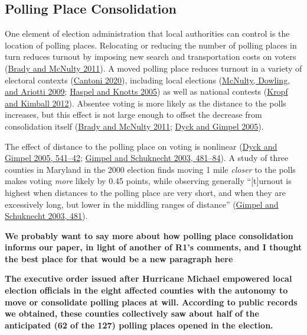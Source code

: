 \documentclass[
  12pt,
]{article}
\begin{document}
\hypertarget{polling-place-consolidation}{%
\subsection*{Polling Place Consolidation}\label{polling-place-consolidation}}

One element of election administration that local authorities can control is the location of polling places. Relocating or reducing the number of polling places in turn reduces turnout by imposing new search and transportation costs on voters (\protect\hyperlink{ref-Brady2011}{Brady and McNulty 2011}). A moved polling place reduces turnout in a variety of electoral contexts (\protect\hyperlink{ref-Cantoni2020}{Cantoni 2020}), including local elections (\protect\hyperlink{ref-McNulty2009}{McNulty, Dowling, and Ariotti 2009}; \protect\hyperlink{ref-Haspel2005}{Haspel and Knotts 2005}) as well as national contests (\protect\hyperlink{ref-Kropf2012}{Kropf and Kimball 2012}). Absentee voting is more likely as the distance to the polls increases, but this effect is not large enough to offset the decrease from consolidation itself (\protect\hyperlink{ref-Brady2011}{Brady and McNulty 2011}; \protect\hyperlink{ref-Dyck2005}{Dyck and Gimpel 2005}).

The effect of distance to the polling place on voting is nonlinear (\protect\hyperlink{ref-Dyck2005}{Dyck and Gimpel 2005, 541--42}; \protect\hyperlink{ref-Gimpel2003}{Gimpel and Schuknecht 2003, 481--84}). A study of three counties in Maryland in the 2000 election finds moving 1 mile \emph{closer} to the polls makes voting \emph{more} likely by 0.45 points, while observing generally ``{[}t{]}urnout is highest when distances to the polling place are very short, and when they are excessively long, but lower in the middling ranges of distance'' (\protect\hyperlink{ref-Gimpel2003}{Gimpel and Schuknecht 2003, 481}).

\textbf{We probably want to say more about how polling place consolidation informs our paper, in light of another of R1's comments, and I thought the best place for that would be a new paragraph here}

\textbf{The executive order issued after Hurricane Michael empowered local election officials in the eight affected counties with the autonomy to move or consolidate polling places at will. According to public records we obtained, these counties collectively saw about half of the anticipated (62 of the 127) polling places opened in the election.}
\end{document}
